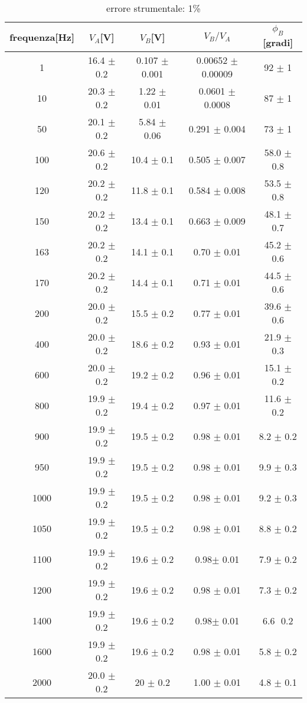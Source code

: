 \documentclass{article}
\theoremstyle{definition}
\begin{document}
\begin{table}[!htbp]
{    \begin{tabular}{c|c|c|c|c}
        frequenza[Hz] & \(V_{A}\)[V] & \(V_{B}\)[V] & \(V_{B}/V_{A}\) & \(\phi_{B}\)[gradi] \\
        \hline
        \hline
       1       & 16.4 $\pm $ 0.2      & 0.107 $\pm $ 0.001 & 0.00652 $ \pm$ 0.00009 & 92 $\pm $ 1\\
        10      & 20.3 $\pm $ 0.2    & 1.22 $\pm $ 0.01 & 0.0601 $\pm $ 0.0008 & 87 $\pm $ 1 \\
        50      & 20.1 $ \pm$ 0.2        & 5.84 $ \pm$ 0.06  & 0.291 $\pm $ 0.004 & 73 $\pm $ 1\\
        100     & 20.6 $\pm $ 0.2     & 10.4 $\pm $ 0.1  & 0.505 $\pm $ 0.007 & 58.0 $\pm $ 0.8\\
        120     & 20.2 $\pm $ 0.2       & 11.8 $\pm $ 0.1  & 0.584 $ \pm$ 0.008& 53.5 $\pm $ 0.8\\
        150     & 20.2 $\pm $ 0.2       & 13.4 $\pm $ 0.1 & 0.663 $\pm $ 0.009 & 48.1 $\pm $ 0.7\\
        163     & 20.2 $ \pm$ 0.2     & 14.1 $\pm $ 0.1 & 0.70 $\pm $ 0.01& 45.2 $\pm $ 0.6 \\
        170     & 20.2 $ \pm$ 0.2     & 14.4 $\pm $ 0.1& 0.71 $\pm $ 0.01 & 44.5 $\pm $ 0.6\\
        200     & 20.0 $\pm $ 0.2    & 15.5 $\pm $ 0.2    & 0.77 $\pm $ 0.01& 39.6 $\pm $ 0.6 \\
        400     & 20.0 $\pm $ 0.2    & 18.6 $\pm $ 0.2  & 0.93 $\pm $ 0.01& 21.9 $\pm $ 0.3  \\
        600     & 20.0 $\pm $ 0.2    & 19.2 $\pm $ 0.2  & 0.96 $\pm $ 0.01 & 15.1 $ \pm$ 0.2\\
        800     & 19.9 $\pm $ 0.2      & 19.4 $ \pm$ 0.2& 0.97 $ \pm$ 0.01& 11.6 $\pm $ 0.2 \\
        900     & 19.9 $ \pm$ 0.2  & 19.5 $\pm $ 0.2  & 0.98 $\pm $ 0.01& 8.2 $\pm $ 0.2\\
        950     & 19.9 $\pm $ 0.2        & 19.5 $\pm $ 0.2        & 0.98 $\pm $ 0.01    & 9.9 $\pm $ 0.3 \\
        1000    & 19.9 $\pm $ 0.2       & 19.5 $\pm $ 0.2       & 0.98 $\pm $ 0.01& 9.2 $\pm $ 0.3  \\
        1050    & 19.9 $ \pm$ 0.2       & 19.5 $\pm $ 0.2        & 0.98 $\pm $ 0.01& 8.8 $ \pm$ 0.2\\
        1100    & 19.9 $\pm $ 0.2 & 19.6 $\pm $ 0.2     & 0.98$\pm $ 0.01 & 7.9 $\pm $ 0.2\\
        1200    & 19.9 $\pm $ 0.2& 19.6 $\pm $ 0.2   & 0.98 $\pm $ 0.01& 7.3 $\pm $ 0.2 \\
        1400    & 19.9 $\pm $ 0.2  & 19.6 $\pm $ 0.2   & 0.98$\pm $ 0.01& 6.6 $ $ 0.2\\
        1600    & 19.9 $\pm $ 0.2& 19.6 $\pm $ 0.2& 0.98 $\pm $ 0.01 & 5.8 $\pm $ 0.2\\
        2000    & 20.0 $\pm $ 0.2    & 20 $\pm $ 0.2    & 1.00 $\pm $ 0.01 & 4.8 $\pm $ 0.1\\
        \hline
        \hline
    \end{tabular}
    }
\caption{errore strumentale: 1\%}
\end{table}
\end{document}
